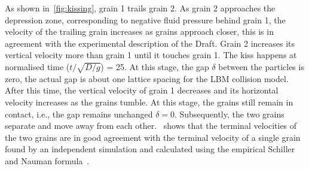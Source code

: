 As shown in~\cref{fig:kissing}, grain 1 trails grain 2. As grain 2 approaches 
the depression zone, corresponding to negative fluid pressure behind grain 1, 
the velocity of the trailing grain increases as grains approach closer, 
this is in agreement with the experimental description of the Draft. Grain 2 
increases its vertical velocity more than grain 1 until it touches grain 1. The 
kiss happens at normalised time ($t/\sqrt{D/g}$)  = 25. At this stage, the gap 
$\delta$ between the particles is zero, the actual gap is about one lattice 
spacing for the LBM collision model. After this time, the vertical velocity of 
grain 1 decreases and its horizontal velocity increases as the grains tumble. 
At this stage, the grains still remain in contact, i.e., the gap remains 
unchanged $\delta=0$. Subsequently, the two grains separate and move away from 
each other.~ shows that the terminal 
velocities of the two grains are in good agreement with the terminal velocity 
of a single grain found by an independent simulation and calculated using the 
empirical Schiller and Nauman formula~\citep{Komiwes2005}.

